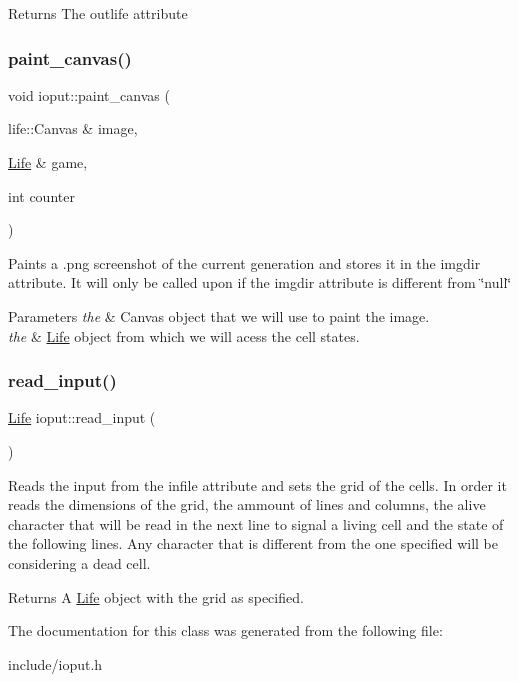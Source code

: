 \begin{DoxyReturn}{Returns}
The outlife attribute 
\end{DoxyReturn}
\mbox{\label{classioput_a4433619447855826728a3dca5f94d2b3}} 
\subsubsection{\texorpdfstring{paint\+\_\+canvas()}{paint\_canvas()}}
{\footnotesize\ttfamily void ioput\+::paint\+\_\+canvas (\begin{DoxyParamCaption}\item[{life\+::\+Canvas \&}]{image,  }\item[{\hyperlink{structLife}{Life} \&}]{game,  }\item[{int}]{counter }\end{DoxyParamCaption})}

Paints a .png screenshot of the current generation and stores it in the imgdir attribute. It will only be called upon if the imgdir attribute is different from \char`\"{}null\char`\"{} 
\begin{DoxyParams}{Parameters}
{\em the} & Canvas object that we will use to paint the image. \\
\hline
{\em the} & \hyperlink{structLife}{Life} object from which we will acess the cell states. \\
\hline
\end{DoxyParams}
\mbox{\label{classioput_a8d0f8f175f48d2102e99483b6f1181ed}} 
\subsubsection{\texorpdfstring{read\+\_\+input()}{read\_input()}}
{\footnotesize\ttfamily \hyperlink{structLife}{Life} ioput\+::read\+\_\+input (\begin{DoxyParamCaption}{ }\end{DoxyParamCaption})}

Reads the input from the infile attribute and sets the grid of the cells. In order it reads the dimensions of the grid, the ammount of lines and columns, the alive character that will be read in the next line to signal a living cell and the state of the following lines. Any character that is different from the one specified will be considering a dead cell. \begin{DoxyReturn}{Returns}
A \hyperlink{structLife}{Life} object with the grid as specified. 
\end{DoxyReturn}


The documentation for this class was generated from the following file\+:\begin{DoxyCompactItemize}
\item 
include/ioput.\+h\end{DoxyCompactItemize}
